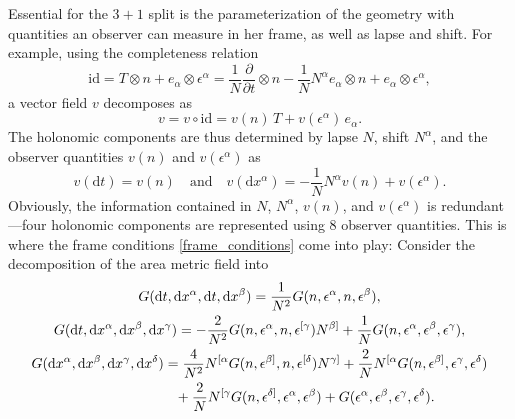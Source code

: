 Essential for the $3+1$ split is the parameterization of the geometry with quantities an observer can measure in her frame, as well as lapse and shift. For example, using the completeness relation
\begin{equation}
  \mathrm{id} = T\otimes n + e_\alpha \otimes \epsilon^\alpha = \frac{1}{N} \frac{\partial}{\partial t} \otimes n - \frac{1}{N} N^\alpha e_\alpha \otimes n + e_\alpha \otimes \epsilon^\alpha,
\end{equation}
a vector field $v$ decomposes as
\begin{equation}
  v = v\circ \mathrm{id} = v(n)\, T + v(\epsilon^\alpha)\, e_\alpha.
\end{equation}
The holonomic components are thus determined by lapse $N$, shift $N^\alpha$, and the observer quantities $v(n)$ and $v(\epsilon^\alpha)$ as
\begin{equation}
  v(\mathrm dt) = v(n)\quad\text{and}\quad v(\mathrm dx^\alpha) = -\frac{1}{N}N^\alpha v(n) + v(\epsilon^\alpha).
\end{equation}
Obviously, the information contained in $N$, $N^\alpha$, $v(n)$, and $v(\epsilon^\alpha)$ is redundant---four holonomic components are represented using 8 observer quantities. This is where the frame conditions \eqref{frame_conditions} come into play: Consider the decomposition of the area metric field into \cite{Giesel_2012}
\begin{gather}
  G(\mathrm dt,\mathrm dx^\alpha,\mathrm dt,\mathrm dx^\beta) = \frac{1}{N^2} G(n,\epsilon^\alpha,n,\epsilon^\beta), \\
  G(\mathrm dt,\mathrm dx^\alpha, \mathrm dx^\beta, \mathrm dx^\gamma) = -\frac{2}{N^2} G(n,\epsilon^\alpha,n,\epsilon^{\lbrack\gamma})N^{\beta\rbrack} + \frac{1}{N} G(n,\epsilon^\alpha,\epsilon^\beta,\epsilon^\gamma), \\
  \begin{aligned}
    G(\mathrm dx^\alpha, \mathrm dx^\beta, \mathrm dx^\gamma, \mathrm dx^\delta) &{} = \frac{4}{N^2} N^{\lbrack\alpha}G(n,\epsilon^{\beta\rbrack},n,\epsilon^{\lbrack\delta})N^{\gamma\rbrack} + \frac{2}{N} N^{\lbrack\alpha}G(n,\epsilon^{\beta\rbrack},\epsilon^\gamma,\epsilon^\delta) \\
                                                                                 &{} \hphantom{=} + \frac{2}{N} N^{\lbrack\gamma}G(n,\epsilon^{\delta\rbrack},\epsilon^\alpha,\epsilon^\beta) + G(\epsilon^\alpha,\epsilon^\beta,\epsilon^\gamma,\epsilon^\delta).
  \end{aligned}
\end{gather}
